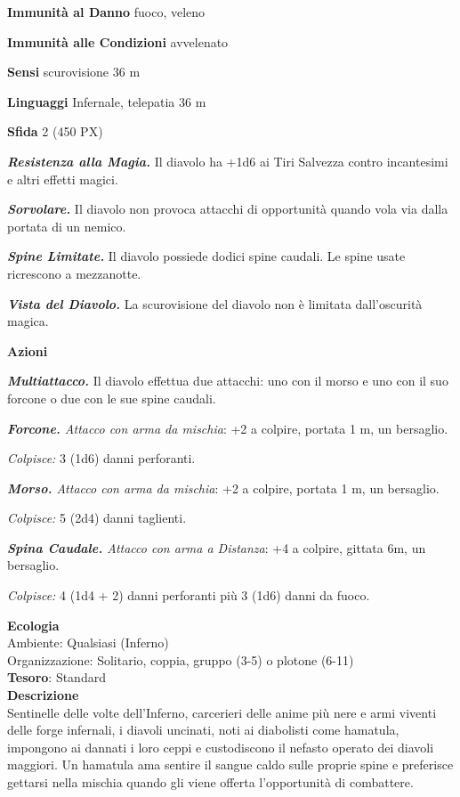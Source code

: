 \begin{multicols}{2}
\textbf{Immunità al Danno} fuoco, veleno

\textbf{Immunità alle Condizioni} avvelenato

\textbf{Sensi} scurovisione 36 m

\textbf{Linguaggi} Infernale, telepatia 36 m

\textbf{Sfida} 2 (450 PX)

\textit{\textbf{Resistenza alla Magia.}} Il diavolo ha +1d6 ai Tiri Salvezza contro incantesimi e altri effetti magici.

\textit{\textbf{Sorvolare.}} Il diavolo non provoca attacchi di opportunità quando vola via dalla portata di un nemico.

\textit{\textbf{Spine Limitate.}} Il diavolo possiede dodici spine caudali. Le spine usate ricrescono a mezzanotte.

\textit{\textbf{Vista del Diavolo.}} La scurovisione del diavolo non è limitata dall'oscurità magica.

\textbf{Azioni}

\textit{\textbf{Multiattacco.}} Il diavolo effettua due attacchi: uno con il morso e uno con il suo forcone o due con le sue spine caudali.

\textit{\textbf{Forcone.} Attacco con arma da mischia}: +2 a colpire, portata 1 m, un bersaglio.

\textit{Colpisce:} 3 (1d6) danni perforanti.

\textit{\textbf{Morso.} Attacco con arma da mischia}: +2 a colpire, portata 1 m, un bersaglio.

\textit{Colpisce:} 5 (2d4) danni taglienti.

\textit{\textbf{Spina Caudale.} Attacco con arma a Distanza}: +4 a colpire, gittata 6m, un bersaglio.

\textit{Colpisce:} 4 (1d4 + 2) danni perforanti più 3 (1d6) danni da fuoco.

\textbf{Ecologia}\\
Ambiente: Qualsiasi (Inferno)\\
Organizzazione: Solitario, coppia, gruppo (3-5) o plotone (6-11)\\
\textbf{Tesoro}: Standard\\
\textbf{Descrizione}\\
Sentinelle delle volte dell'Inferno, carcerieri delle anime più nere e armi viventi delle forge infernali, i diavoli uncinati, noti ai diabolisti come hamatula, impongono ai dannati i loro ceppi e custodiscono il nefasto operato dei diavoli maggiori. Un hamatula ama sentire il sangue caldo sulle proprie spine e preferisce gettarsi nella mischia quando gli viene offerta l'opportunità di combattere.


\end{multicols}
